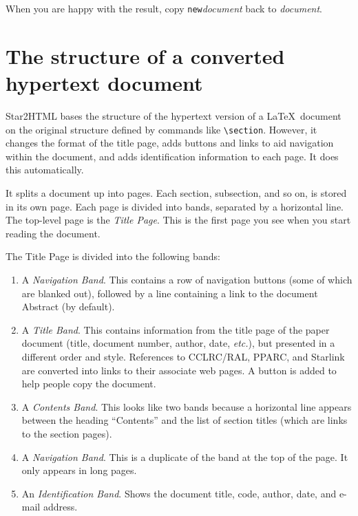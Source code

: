\documentclass[twoside,11pt,nolof]{starlink}
\begin{document}
When you are happy with the result, copy \texttt{new}\textit{document} back to
\textit{document}.

\newpage

\section{The structure of a converted hypertext document}

Star2HTML bases the structure of the hypertext version of a \LaTeX\ document
on the original structure defined by commands like \verb+\section+.
However, it changes the format of the title page, adds buttons and links
to aid navigation within the document, and adds identification information
to each page.
It does this automatically.

It splits a document up into pages.
Each section, subsection, and so on, is stored in its own page.
Each page is divided into bands, separated by a horizontal line.
The top-level page is the \emph{Title Page}.
This is the first page you see when you start reading the document.

The Title Page is divided into the following bands:

\begin{enumerate}
\item A \emph{Navigation Band}.
 This contains a row of navigation buttons (some of which are blanked out),
 followed by a line containing a link to the document Abstract (by default).
\item A \emph{Title Band}.
 This contains information from the title page of the paper document (title,
 document number, author, date, \textit{etc.}), but presented in a different
 order and style.
 References to CCLRC/RAL, PPARC, and Starlink are converted into links
 to their associate web pages.
 A button is added to help people copy the document.
\item A \emph{Contents Band}.
 This looks like two bands because a horizontal line appears between the heading
 ``Contents'' and the list of section titles (which are links to the
 section pages).
\item A \emph{Navigation Band}.
 This is a duplicate of the band at the top of the page.
 It only appears in long pages.
\item An \emph{Identification Band}.
 Shows the document title, code, author, date, and e-mail address.
\end{enumerate}
\end{document}

